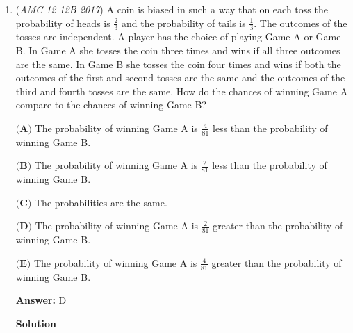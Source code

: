 \begin{enumerate}
 In other words, $21!$ has $(18+1)(9+1)(4+1)(3+1)(1+1)(1+1)(1+1)(1+1)$ factors. 

 We are looking for the probability that a randomly chosen factor of $21!$ will be odd--numbers that do not contain multiples of $2$ as factors.

 From our earlier observation, the only factors of $21!$ that are even are ones with at least one multiplier of $2$, so our probability of finding an odd factor becomes the following:
 \[P(\text{odd})=\dfrac{\text{number of odd factors}}{\text{number of all factors}}=\dfrac{(9+1)(4+1)(3+1)(1+1)(1+1)(1+1)(1+1)}{(18+1)(9+1)(4+1)(3+1)(1+1)(1+1)(1+1)(1+1)}=\dfrac{1}{(18+1)}=\boxed{\dfrac{1}{19}}\]

 Solution submitted by \href{https://artofproblemsolving.com/wiki/index.php?title=User:TrueshotBarrage&action=edit&redlink=1}{David Kim}

 -MistyMathMusic

 


	\item (\textit{AMC 12 12B 2017}) A coin is biased in such a way that on each toss the probability of heads is $\frac{2}{3}$ and the probability of tails is $\frac{1}{3}$. The outcomes of the tosses are independent. A player has the choice of playing Game A or Game B. In Game A she tosses the coin three times and wins if all three outcomes are the same. In Game B she tosses the coin four times and wins if both the outcomes of the first and second tosses are the same and the outcomes of the third and fourth tosses are the same. How do the chances of winning Game A compare to the chances of winning Game B?


 $\textbf{(A)}$ The probability of winning Game A is $\frac{4}{81}$ less than the probability of winning Game B.


 $\textbf{(B)}$ The probability of winning Game A is $\frac{2}{81}$ less than the probability of winning Game B.


 $\textbf{(C)}$ The probabilities are the same.


 $\textbf{(D)}$ The probability of winning Game A is $\frac{2}{81}$ greater than the probability of winning Game B.


 $\textbf{(E)}$ The probability of winning Game A is $\frac{4}{81}$ greater than the probability of winning Game B.


 
 \textbf{Answer: }D



\textbf{Solution}


\end{enumerate}
